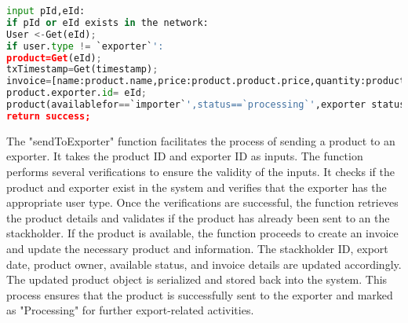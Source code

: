 \begin{lstlisting}[language=Python , caption=send to exporter]
input pId,eId:
if pId or eId exists in the network:
User <-Get(eId);
if user.type != `exporter`':
product=Get(eId);
txTimestamp=Get(timestamp);			 
invoice=[name:product.name,price:product.product.price,quantity:product.product.quantity]
product.exporter.id= eId;
product(availablefor==`importer`',status==`processing`',exporter status==`processing`');
return success;       
\end{lstlisting}
The "sendToExporter" function facilitates the process of sending a product to an exporter. It takes the product ID and exporter ID as inputs. The function performs several verifications to ensure the validity of the inputs. It checks if the product and exporter exist in the system and verifies that the exporter has the appropriate user type. Once the verifications are successful, the function retrieves the product details and validates if the product has already been sent to an the stackholder. If the product is available, the function proceeds to create an invoice and update the necessary product and information. The stackholder ID, export date, product owner, available status, and invoice details are updated accordingly. The updated product object is serialized and stored back into the system. This process ensures that the product is successfully sent to the exporter and marked as "Processing" for further export-related activities.